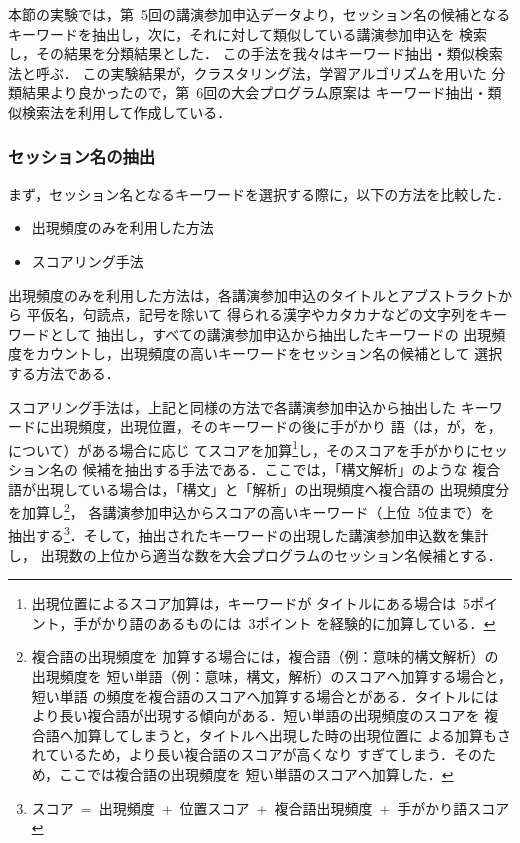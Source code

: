 本節の実験では，第\ 5回の講演参加申込データより，セッション名の候補となる
キーワードを抽出し，次に，それに対して類似している講演参加申込を
検索し，その結果を分類結果とした．
この手法を我々はキーワード抽出・類似検索法と呼ぶ\cite{Ozaku1998}．
この実験結果が，クラスタリング法，学習アルゴリズムを用いた
分類結果より良かったので，第\ 6回の大会プログラム原案は
キーワード抽出・類似検索法を利用して作成している．

\subsubsection{セッション名の抽出}
\label{keyda}
まず，セッション名となるキーワードを選択する際に，以下の方法を比較した．

\begin{itemize}
\item 出現頻度のみを利用した方法
\item スコアリング手法
\end{itemize}

出現頻度のみを利用した方法は，各講演参加申込のタイトルとアブストラクトから
平仮名，句読点，記号を除いて
得られる漢字やカタカナなどの文字列をキーワードとして
抽出\cite{Miyamoto1993}し，すべての講演参加申込から抽出したキーワードの
出現頻度をカウントし，出現頻度の高いキーワードをセッション名の候補として
選択する方法である．

スコアリング手法は，上記と同様の方法で各講演参加申込から抽出した
キーワードに出現頻度，出現位置，そのキーワードの後に手がかり
語（は，が，を，について）がある場合に応じ
てスコアを加算\footnote{出現位置によるスコア加算は，キーワードが
タイトルにある場合は\ 5ポイント，手がかり語のあるものには\ 3ポイント
を経験的に加算している．}し，そのスコアを手がかりにセッション名の
候補を抽出する手法である．ここでは，「構文解析」のような
複合語が出現している場合は，「構文」と「解析」の出現頻度へ複合語の
出現頻度分を加算し\footnote{複合語の出現頻度を
加算する場合には，複合語（例：意味的構文解析）の出現頻度を
短い単語（例：意味，構文，解析）のスコアへ加算する場合と，短い単語
の頻度を複合語のスコアへ加算する場合とがある．タイトルには
より長い複合語が出現する傾向がある．短い単語の出現頻度のスコアを
複合語へ加算してしまうと，タイトルへ出現した時の出現位置に
よる加算もされているため，より長い複合語のスコアが高くなり
すぎてしまう．そのため，ここでは複合語の出現頻度を
短い単語のスコアへ加算した．}，
各講演参加申込からスコアの高いキーワード（上位\ 5位まで）を
抽出する\footnote{
スコア\ =\ 出現頻度\ +\ 位置スコア\ +\ 複合語出現頻度\ +\ 手がかり語スコア 
}．そして，抽出されたキーワードの出現した講演参加申込数を集計し，
出現数の上位から適当な数を大会プログラムのセッション名候補とする．


